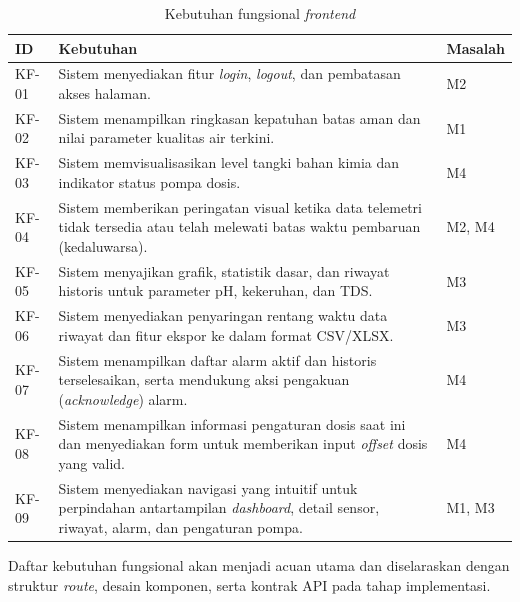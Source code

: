 \begin{table}[H]
\centering
\caption{Kebutuhan fungsional \textit{frontend}}
\label{tab:kebutuhan-fungsional}
\begin{tabular}{|p{1.3cm}|p{10.5cm}|p{1.4cm}|}
\hline
\textbf{ID} & \textbf{Kebutuhan} & \textbf{Masalah} \\
\hline
KF-01 & Sistem menyediakan fitur \textit{login}, \textit{logout}, dan pembatasan akses halaman. & M2 \\
\hline
KF-02 & Sistem menampilkan ringkasan kepatuhan batas aman dan nilai parameter kualitas air terkini. & M1 \\
\hline
KF-03 & Sistem memvisualisasikan level tangki bahan kimia dan indikator status pompa dosis. & M4 \\
\hline
KF-04 & Sistem memberikan peringatan visual ketika data telemetri tidak tersedia atau telah melewati batas waktu pembaruan (kedaluwarsa). & M2, M4 \\
\hline
KF-05 & Sistem menyajikan grafik, statistik dasar, dan riwayat historis untuk parameter pH, kekeruhan, dan TDS. & M3 \\
\hline
KF-06 & Sistem menyediakan penyaringan rentang waktu data riwayat dan fitur ekspor ke dalam format CSV/XLSX. & M3 \\
\hline
KF-07 & Sistem menampilkan daftar alarm aktif dan historis terselesaikan, serta mendukung aksi pengakuan (\textit{acknowledge}) alarm. & M4 \\
\hline
KF-08 & Sistem menampilkan informasi pengaturan dosis saat ini dan menyediakan form untuk memberikan input \textit{offset} dosis yang valid. & M4 \\
\hline
KF-09 & Sistem menyediakan navigasi yang intuitif untuk perpindahan antartampilan \textit{dashboard}, detail sensor, riwayat, alarm, dan pengaturan pompa. & M1, M3 \\
\hline
\end{tabular}
\end{table}

Daftar kebutuhan fungsional akan menjadi acuan utama dan diselaraskan 
dengan struktur \textit{route}, desain komponen, serta kontrak API pada tahap implementasi.


